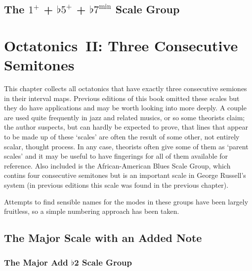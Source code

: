 \documentclass[english]{./gbook}
\newcommand{\titlebreak}{}
\begin{document}
\begin{large}
\section{The $1^+$ + $\flat 5^+$ + $\flat 7^{\text{min}}$ Scale Group}







\chapter{\mbox{Octatonics II:} \titlebreak \mbox{Three} \mbox{Consecutive} \mbox{Semitones}}

This chapter collects all octatonics that have exactly three consecutive semiones in their interval maps. Previous editions of this book omitted these scales but they do have applications and may be worth looking into more deeply. A couple are used quite frequently in jazz and related musics, or so some theorists claim; the author suspects, but can hardly be expected to prove, that lines that appear to be made up of these `scales' are often the result of some other, not entirely scalar, thought process. In any case, theorists often give some of them as `parent scales' and it may be useful to have fingerings for all of them available for reference. Also included is the African-American Blues Scale Group, which contins four consecutive semitones but is an important scale in George Russell's system (in previous editions this scale was found in the previous chapter).

Attempts to find sensible names for the modes in these groups have been largely fruitless, so a simple numbering approach has been taken.

\section{The Major Scale with an Added Note}

\subsection{The Major Add $\flat$2 Scale Group}


\end{large}
\end{document}
